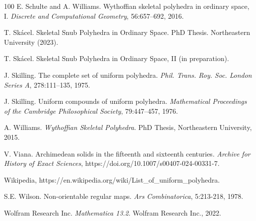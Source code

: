 \documentclass[12pt]{article}
\theoremstyle{definition}\newtheorem{definition}{Definition}[section]
\begin{document}
\begin{thebibliography}{100}
    E. Schulte and A. Williams. Wythoffian skeletal polyhedra in ordinary space, I. \textit{Discrete and Computational Geometry}, 56:657–692, 2016.

    T. Sk\'acel. Skeletal Snub Polyhedra in Ordinary Space. PhD Thesis. Northeastern University (2023).

    T. Sk\'acel. Skeletal Snub Polyhedra in Ordinary Space, II (in preparation).
    
    J. Skilling. The complete set of uniform polyhedra. \textit{Phil. Trans. Roy. Soc. London Series A}, 278:111–135, 1975.

    J. Skilling. Uniform compounds of uniform polyhedra. \textit{Mathematical Proceedings of the Cambridge Philosophical Society}, 79:447–457, 1976.


    A. Williams. \textit{Wythoffian Skeletal Polyhedra}. PhD Thesis, Northeastern University, 2015. 

    V. Viana. Archimedean solids in the fifteenth and sixteenth centuries. \textit{Archive for History of Exact Sciences}, https://doi.org/10.1007/s00407-024-00331-7.
    
    Wikipedia, https://en.wikipedia.org/wiki/List\_of\_uniform\_polyhedra.

    S.E. Wilson. Non-orientable regular maps. \textit{Ars Combinatorica}, 5:213-218, 1978.

    Wolfram Research Inc. \textit{Mathematica 13.2}. Wolfram Research Inc., 2022.
\end{thebibliography}
\end{document}
